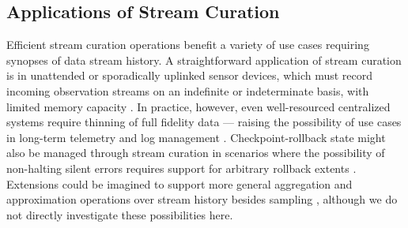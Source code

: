 



\subsection{Applications of Stream Curation}

Efficient stream curation operations benefit a variety of use cases requiring synopses of data stream history.
A straightforward application of stream curation is in unattended or sporadically uplinked sensor devices, which must record incoming observation streams on an indefinite or indeterminate basis, with limited memory capacity \citep{jain2022survey}.
In practice, however, even well-resourced centralized systems require thinning of full fidelity data --- raising the possibility of use cases in long-term telemetry and log management \citep{kent2006guide,miebach2002hubble}.
Checkpoint-rollback state might also be managed through stream curation in scenarios where the possibility of non-halting silent errors requires support for arbitrary rollback extents \citep{aupy2013combination}.
Extensions could be imagined to support more general aggregation and approximation operations over stream history besides sampling \citep{schoellhammer2024lightweight}, although we do not directly investigate these possibilities here.


